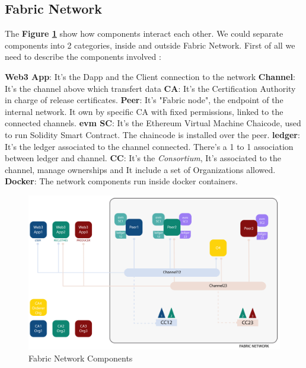 \subsection{Fabric Network}

The \textbf{Figure \ref{fig:network}} show how components interact each other. We could separate components into 2 categories,
inside and outside Fabric Network. First of all we need to describe the components involved :

\begin{outline}
    \1 \textbf{Web3 App}: It's the Dapp and the Client connection to the network
    \1 \textbf{Channel}: It's the channel above which transfert data 
    \1 \textbf{CA}: It's the Certification Authority in charge of release certificates.
    \1 \textbf{Peer}: It's "Fabric node", the endpoint of the internal network. It own by specific CA with 
    fixed permissions, linked to the connected channels. 
    \1 \textbf{evm SC}: It's the Ethereum Virtual Machine Chaicode, used to run Solidity Smart Contract. The chaincode 
    is installed over the peer.
    \1 \textbf{ledger}: It's the ledger associated to the channel connected. There's a 1 to 1 association 
    between ledger and channel.
    \1 \textbf{CC}: It's the \textit{Consortium}, It's associated to the channel, manage ownerships and 
    It include a set of Organizations allowed. 
    \1 \textbf{Docker}: The network components run inside docker containers. 
\end{outline}

\begin{figure}[h!]
	\centering
	\includegraphics[totalheight=10cm]{img/network.png}
	\caption{Fabric Network Components}
	\label{fig:network}
\end{figure}

